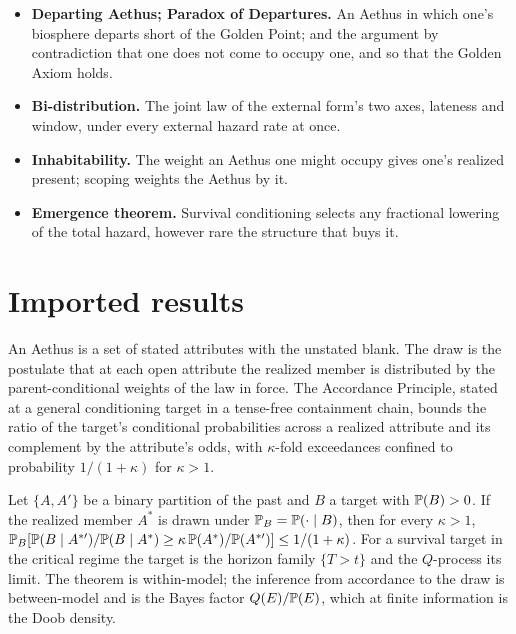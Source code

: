 \begin{itemize}[itemsep=2pt]
that one's biosphere survives through every proper time, all else blank;
and the axiom that it is a parent Aethus of one's own,
$H^{\ast}\sqsubseteq\mathfrak G$, the Strong hypothesis in the
framework's primitives.
\item \textbf{Departing Aethus; Paradox of Departures.} An Aethus in which
one's biosphere departs short of the Golden Point; and the
argument by contradiction that one does not come to occupy one, and so
that the Golden Axiom holds.
\item \textbf{Bi-distribution.} The joint law of the external form's two
axes, lateness and window, under every external hazard rate at once.
\item \textbf{Inhabitability.} The weight an Aethus one might occupy gives
one's realized present; scoping weights the Aethus by it.
\item \textbf{Emergence theorem.} Survival conditioning selects any
fractional lowering of the total hazard, however rare the structure
that buys it.
\end{itemize}

\section{Imported results}\label{sec:imports}

\begin{definition}
\label{imp:accordance}
An Aethus is a set of stated attributes with the unstated blank. The draw
is the postulate that at each open attribute the realized member is
distributed by the parent-conditional weights of the law in force. The
Accordance Principle, stated at a general conditioning target in a
tense-free containment chain, bounds the ratio of the target's conditional
probabilities across a realized attribute and its complement by the
attribute's odds, with $\kappa$-fold exceedances confined to probability
$1/(1+\kappa)$ for $\kappa>1$.
\end{definition}

\begin{theorem}
\label{imp:targeted}
Let $\{A,A'\}$ be a binary partition of the past and $B$ a target with
$\mathbb{P}(B)>0$. If the realized member $A^\ast$ is drawn under
$\mathbb{P}_B=\mathbb{P}(\cdot\mid B)$, then for every $\kappa>1$,
$\mathbb{P}_B[\mathbb{P}(B\mid A^{\ast\prime})/\mathbb{P}(B\mid A^\ast)\ge\kappa\,\mathbb{P}(A^\ast)/\mathbb{P}(A^{\ast\prime})]\le1/(1+\kappa)$.
For a survival target in the critical regime the target is the horizon
family $\{T>t\}$ and the $Q$-process its limit. The theorem is
within-model; the inference from accordance to the draw is between-model
and is the Bayes factor $Q(E)/\mathbb{P}(E)$, which at finite information is the
Doob density.
\end{theorem}

